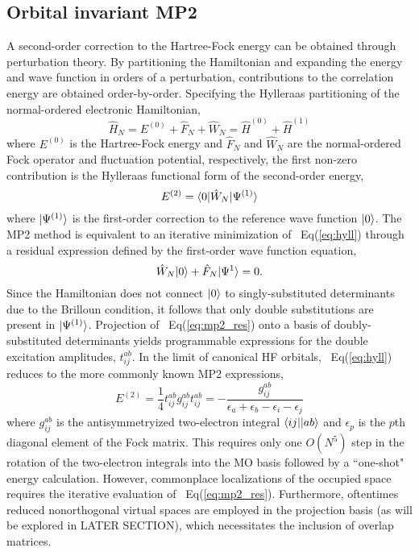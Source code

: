 \subsection{Orbital invariant MP2} \label{ss:mp2}
A second-order correction to the Hartree-Fock energy can be obtained through perturbation theory.
By partitioning the Hamiltonian and expanding the energy and wave function in orders of a perturbation, contributions to the correlation energy are obtained order-by-order. Specifying the Hylleraas partitioning of the normal-ordered electronic Hamiltonian,
\begin{equation} \label{eq:H}
    \hat{H}_N = E^{(0)} + \hat{F}_N + \hat{W}_N = \hat{H}^{(0)} + \hat{H}^{(1)} 
\end{equation}
where $E^{(0)}$ is the Hartree-Fock energy and $\hat{F}_N$ and $\hat{W}_N$ are the normal-ordered Fock 
operator and fluctuation potential, respectively, the first non-zero contribution is the Hylleraas 
functional form of the second-order energy,
\begin{equation} \label{eq:hyll}
    E^{(2)} = \langle0 |\hat{W}_N| \Psi^{(1)} \rangle
\end{equation}
where $| \Psi^{(1)} \rangle$ is the first-order correction to the reference wave function $| 0 \rangle$.
The MP2 method is equivalent to an iterative minimization of ~Eq(\ref{eq:hyll}) through a residual expression defined by the first-order wave function equation,
\begin{equation} \label{eq:mp2_res}
    \hat{W}_N| 0 \rangle + \hat{F}_N| \Psi^1 \rangle = 0.
\end{equation}
Since the Hamiltonian does not connect $| 0 \rangle$ to singly-substituted determinants due to the Brilloun condition, it follows that only double substitutions are present in $| \Psi^{(1)} \rangle$. 
Projection of ~Eq(\ref{eq:mp2_res}) onto a basis of doubly-substituted determinants yields programmable expressions for the double excitation amplitudes, $t^{ab}_{ij}$. In the limit of canonical HF orbitals, ~Eq(\ref{eq:hyll}) reduces to the more commonly known MP2 expressions,
\begin{subequations}
    \begin{equation}
        E^{(2)} = \frac{1}{4}t^{ab}_{ij}g^{ab}_{ij}
    \end{equation}
    \begin{equation}
        t^{ab}_{ij} = - \frac{g^{ab}_{ij}}{\epsilon_a + \epsilon_b - \epsilon_i - \epsilon_j} 
    \end{equation}
\end{subequations}
where $g^{ab}_{ij}$ is the antisymmetryized two-electron integral $\langle ij || ab \rangle$ and $\epsilon_p$ is
the $p$th diagonal element of the Fock matrix. 
This requires only one $O(N^5)$ step in the rotation of the two-electron integrals into the MO basis followed by a ``one-shot" energy calculation. 
However, commonplace localizations of the occupied space requires the iterative evaluation of 
~Eq(\ref{eq:mp2_res}). Furthermore, oftentimes reduced nonorthogonal virtual spaces are employed in the 
projection basis (as will be explored in LATER SECTION), which necessitates the inclusion of overlap 
matrices.  

